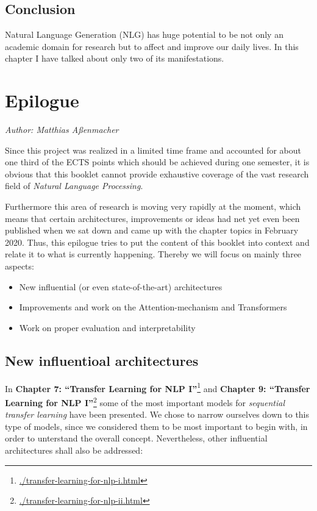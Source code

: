 \documentclass[]{krantz}
\providecommand{\tightlist}{%
  \setlength{\itemsep}{0pt}\setlength{\parskip}{0pt}}
\renewcommand{\href}[2]{#2\footnote{\url{#1}}}
\begin{document}
\hypertarget{conclusion}{%
\section{Conclusion}\label{conclusion}}

Natural Language Generation (NLG) has huge potential to be not only an academic domain for research but to affect and improve our daily lives. In this chapter I have talked about only two of its manifestations.

\hypertarget{epilogue}{%
\chapter{Epilogue}\label{epilogue}}

\emph{Author: Matthias Aßenmacher}

Since this project was realized in a limited time frame and accounted for about one third
of the ECTS points which should be achieved during one semester, it is obvious that this
booklet cannot provide exhaustive coverage of the vast research field of \emph{Natural Language Processing}.

Furthermore this area of research is moving very rapidly at the moment, which means that
certain architectures, improvements or ideas had net yet even been published when we sat down
and came up with the chapter topics in February 2020. Thus, this epilogue tries to put the content
of this booklet into context and relate it to what is currently happening. Thereby we will focus on
mainly three aspects:

\begin{itemize}
\tightlist
\item
  New influential (or even state-of-the-art) architectures
\item
  Improvements and work on the Attention-mechanism and Transformers
\item
  Work on proper evaluation and interpretability
\end{itemize}

\hypertarget{new-influentioal-architectures}{%
\section{New influentioal architectures}\label{new-influentioal-architectures}}

In \href{./transfer-learning-for-nlp-i.html}{\textbf{Chapter 7: ``Transfer Learning for NLP I''}} and \href{./transfer-learning-for-nlp-ii.html}{\textbf{Chapter 9: ``Transfer Learning for NLP I''}} some of the most important models for \emph{sequential transfer learning} have been presented. We chose to narrow ourselves down to this type of models, since we considered them to be most important to begin with, in order to unterstand the overall concept. Nevertheless, other influential architectures shall also be addressed:
\end{document}
